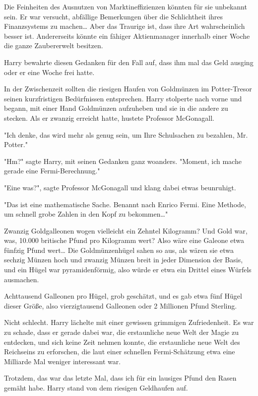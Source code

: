 {Die Feinheiten des Ausnutzen von Marktineffizienzen könnten für sie unbekannt sein. Er war versucht, abfällige Bemerkungen über die Schlichtheit ihres Finanzsystems zu machen… Aber das Traurige ist, dass ihre Art wahrscheinlich besser ist. Andererseits könnte ein fähiger Aktienmanager innerhalb einer Woche die ganze Zaubererwelt besitzen.

Harry bewahrte diesen Gedanken für den Fall auf, dass ihm mal das Geld ausging oder er eine Woche frei hatte.

In der Zwischenzeit sollten die riesigen Haufen von Goldmünzen im Potter-Tresor seinen kurzfristigen Bedürfnissen entsprechen. Harry stolperte nach vorne und begann, mit einer Hand Goldmünzen aufzuheben und sie in die andere zu stecken. Als er zwanzig erreicht hatte, hustete Professor McGonagall.

"Ich denke, das wird mehr als genug sein, um Ihre Schulsachen zu bezahlen, Mr. Potter."

"Hm?" sagte Harry, mit seinen Gedanken ganz woanders. "Moment, ich mache gerade eine Fermi-Berechnung."

"Eine was?", sagte Professor McGonagall und klang dabei etwas beunruhigt.

"Das ist eine mathematische Sache. Benannt nach Enrico Fermi. Eine Methode, um schnell grobe Zahlen in den Kopf zu bekommen…"

Zwanzig Goldgalleonen wogen vielleicht ein Zehntel Kilogramm? Und Gold war, was, 10.000 britische Pfund pro Kilogramm wert? Also wäre eine Galeone etwa fünfzig Pfund wert… Die Goldmünzenhügel sahen so aus, als wären sie etwa sechzig Münzen hoch und zwanzig Münzen breit in jeder Dimension der Basis, und ein Hügel war pyramidenförmig, also würde er etwa ein Drittel eines Würfels ausmachen.

Achttausend Galleonen pro Hügel, grob geschätzt, und es gab etwa fünf Hügel dieser Größe, also vierzigtausend Galleonen oder 2 Millionen Pfund Sterling.

Nicht schlecht. Harry lächelte mit einer gewissen grimmigen Zufriedenheit. Es war zu schade, dass er gerade dabei war, die erstaunliche neue Welt der Magie zu entdecken, und sich keine Zeit nehmen konnte, die erstaunliche neue Welt des Reichseins zu erforschen, die laut einer schnellen Fermi-Schätzung etwa eine Milliarde Mal weniger interessant war.

Trotzdem, das war das letzte Mal, dass ich für ein lausiges Pfund den Rasen gemäht habe. Harry stand von dem riesigen Geldhaufen auf.

}
